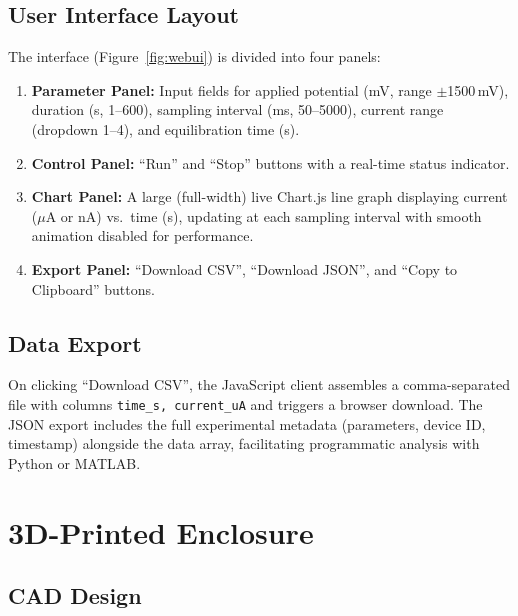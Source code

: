 \subsection{User Interface Layout}

The interface (Figure~\ref{fig:webui}) is divided into four panels:
\begin{enumerate}
    \item \textbf{Parameter Panel:} Input fields for applied potential (mV, range $\pm$1500\,mV), duration (s, 1--600), sampling interval (ms, 50--5000), current range (dropdown 1--4), and equilibration time (s).
    \item \textbf{Control Panel:} ``Run'' and ``Stop'' buttons with a real-time status indicator.
    \item \textbf{Chart Panel:} A large (full-width) live Chart.js line graph displaying current ($\mu$A or nA) vs.\ time (s), updating at each sampling interval with smooth animation disabled for performance.
    \item \textbf{Export Panel:} ``Download CSV'', ``Download JSON'', and ``Copy to Clipboard'' buttons.
\end{enumerate}


\subsection{Data Export}

On clicking ``Download CSV'', the JavaScript client assembles a comma-separated file with columns \texttt{time\_s, current\_uA} and triggers a browser download. The JSON export includes the full experimental metadata (parameters, device ID, timestamp) alongside the data array, facilitating programmatic analysis with Python or MATLAB.

\section{3D-Printed Enclosure}
\label{sec:enclosure}

\subsection{CAD Design}

